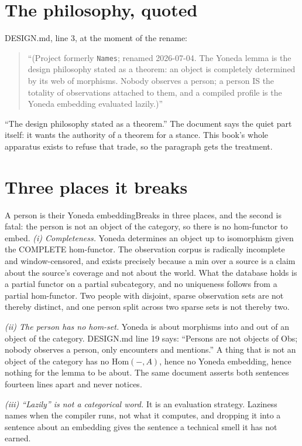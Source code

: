 \section{The philosophy, quoted}

DESIGN.md, line 3, at the moment of the rename:

\begin{quote}
``(Project formerly \texttt{Names}; renamed 2026-07-04. The Yoneda lemma is the design philosophy stated as a theorem: an object is completely determined by its web of morphisms. Nobody observes a person; a person IS the totality of observations attached to them, and a compiled profile is the Yoneda embedding evaluated lazily.)''
\end{quote}

``The design philosophy stated as a theorem.'' The document says the quiet part itself: it wants the authority of a theorem for a stance. This book's whole apparatus exists to refuse that trade, so the paragraph gets the treatment.

\section{Three places it breaks}

\begin{Analogy}{A person is their Yoneda embedding}{Breaks in three places, and the second is fatal: the person is not an object of the category, so there is no hom-functor to embed.}
\emph{(i) Completeness.} Yoneda determines an object up to isomorphism given the COMPLETE hom-functor. The observation corpus is radically incomplete and window-censored, and  exists precisely because a min over a source is a claim about the source's coverage and not about the world. What the database holds is a partial functor on a partial subcategory, and no uniqueness follows from a partial hom-functor. Two people with disjoint, sparse observation sets are not thereby distinct, and one person split across two sparse sets is not thereby two.

\emph{(ii) The person has no hom-set.} Yoneda is about morphisms into and out of an object of the category. DESIGN.md line 19 says: ``Persons are not objects of Obs; nobody observes a person, only encounters and mentions.'' A thing that is not an object of the category has no $\mathrm{Hom}(-,A)$, hence no Yoneda embedding, hence nothing for the lemma to be about. The same document asserts both sentences fourteen lines apart and never notices.

\emph{(iii) ``Lazily'' is not a categorical word.} It is an evaluation strategy. Laziness names when the compiler runs, not what it computes, and dropping it into a sentence about an embedding gives the sentence a technical smell it has not earned.
\end{Analogy}

